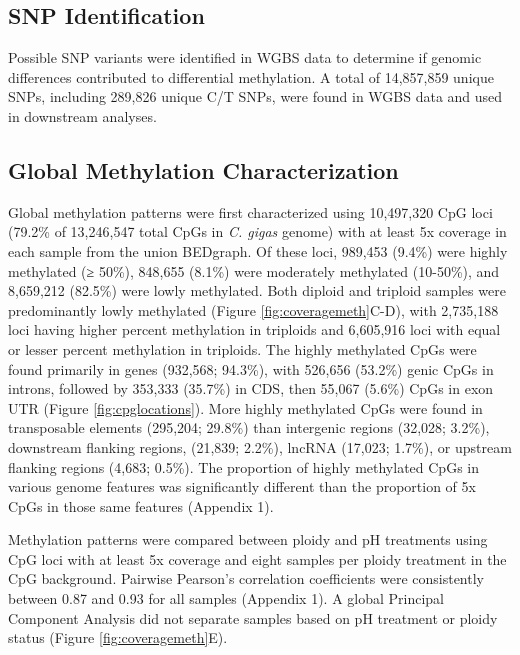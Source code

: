 \documentclass [11pt, proquest] {uwthesis}[2015/03/03]
\begin{document}
\hypertarget{snp-identification-3}{%
\subsection{SNP Identification}\label{snp-identification-3}}

Possible SNP variants were identified in WGBS data to determine if genomic differences contributed to differential methylation. A total of 14,857,859 unique SNPs, including 289,826 unique C/T SNPs, were found in WGBS data and used in downstream analyses.

\hypertarget{global-methylation-characterization-2}{%
\subsection{Global Methylation Characterization}\label{global-methylation-characterization-2}}

Global methylation patterns were first characterized using 10,497,320 CpG loci (79.2\% of 13,246,547 total CpGs in \emph{C. gigas} genome) with at least 5x coverage in each sample from the union BEDgraph. Of these loci, 989,453 (9.4\%) were highly methylated (≥ 50\%), 848,655 (8.1\%) were moderately methylated (10-50\%), and 8,659,212 (82.5\%) were lowly methylated. Both diploid and triploid samples were predominantly lowly methylated (Figure \ref{fig:coveragemeth}C-D), with 2,735,188 loci having higher percent methylation in triploids and 6,605,916 loci with equal or lesser percent methylation in triploids. The highly methylated CpGs were found primarily in genes (932,568; 94.3\%), with 526,656 (53.2\%) genic CpGs in introns, followed by 353,333 (35.7\%) in CDS, then 55,067 (5.6\%) CpGs in exon UTR (Figure \ref{fig:cpglocations}). More highly methylated CpGs were found in transposable elements (295,204; 29.8\%) than intergenic regions (32,028; 3.2\%), downstream flanking regions, (21,839; 2.2\%), lncRNA (17,023; 1.7\%), or upstream flanking regions (4,683; 0.5\%). The proportion of highly methylated CpGs in various genome features was significantly different than the proportion of 5x CpGs in those same features (Appendix 1).

Methylation patterns were compared between ploidy and pH treatments using CpG loci with at least 5x coverage and eight samples per ploidy treatment in the CpG background. Pairwise Pearson's correlation coefficients were consistently between 0.87 and 0.93 for all samples (Appendix 1). A global Principal Component Analysis did not separate samples based on pH treatment or ploidy status (Figure \ref{fig:coveragemeth}E).
\end{document}

